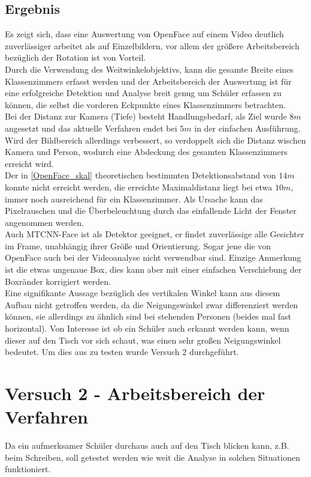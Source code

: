 \subsection{Ergebnis}
Es zeigt sich, dass eine Auswertung von OpenFace auf einem Video deutlich zuverlässiger arbeitet als auf Einzelbildern, vor allem der größere Arbeitsbereich bezüglich der Rotation ist von Vorteil.\\
Durch die Verwendung des Weitwinkelobjektivs, kann die gesamte Breite eines Klassenzimmers erfasst werden und der Arbeitsbereich der Auswertung ist für eine erfolgreiche Detektion und Analyse breit genug um Schüler erfassen zu können, die selbst die vorderen Eckpunkte eines Klassenzimmers betrachten.\\
Bei der Distanz zur Kamera (Tiefe) besteht Handlungsbedarf, als Ziel wurde $8m$ angesetzt und das aktuelle Verfahren endet bei $5m$ in der einfachen Ausführung. Wird der Bildbereich allerdings verbessert, so verdoppelt sich die Distanz wischen Kamera und Person, wodurch eine Abdeckung des gesamten Klassenzimmers erreicht wird.\\
Der in \autoref{OpenFace_skal} theoretischen bestimmten Detektionsabstand von $14m$ konnte nicht erreicht werden, die erreichte Maximaldistanz liegt bei etwa $10m$, immer noch ausreichend für ein Klassenzimmer. Als Ursache kann das Pixelrauschen und die Überbeleuchtung durch das einfallende Licht der Fenster angenommen werden.\\
Auch MTCNN-Face ist als Detektor geeignet, er findet zuverlässige alle Gesichter im Frame, unabhängig ihrer Größe und Orientierung. Sogar jene die von OpenFace auch bei der Videoanalyse nicht verwendbar sind. Einzige Anmerkung ist die etwas ungenaue Box, dies kann aber mit einer einfachen Verschiebung der Boxränder korrigiert werden.\\
Eine signifikante Aussage bezüglich des vertikalen Winkel kann aus diesem Aufbau nicht getroffen werden, da die Neigungswinkel zwar differenziert werden können, sie allerdings zu ähnlich sind bei stehenden Personen (beides mal fast horizontal). Von Interesse ist ob ein Schüler auch erkannt werden kann, wenn dieser auf den Tisch vor sich schaut, was einen sehr großen Neigungswinkel bedeutet. Um dies aus zu testen wurde Versuch 2 durchgeführt.
\section{Versuch 2 - Arbeitsbereich der Verfahren}
Da ein aufmerksamer Schüler durchaus auch auf den Tisch blicken kann, z.B. beim Schreiben, soll getestet werden wie weit die Analyse in solchen Situationen funktioniert.
